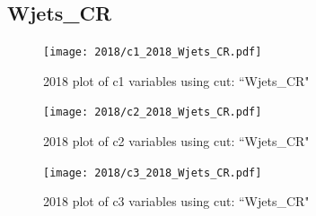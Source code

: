 \documentclass{article}
\begin{document}
      \subsection*{Wjets\_CR}
                        \begin{figure}[H]
                            \centering
                            \caption{2018 plot of c1 variables using cut: ``Wjets\_CR"}
                            \texttt{[image: 2018/c1\_2018\_Wjets\_CR.pdf]}
                        \end{figure}    
                        \begin{figure}[H]
                            \centering
                            \caption{2018 plot of c2 variables using cut: ``Wjets\_CR"}
                            \texttt{[image: 2018/c2\_2018\_Wjets\_CR.pdf]}
                        \end{figure}    
                        \begin{figure}[H]
                            \centering
                            \caption{2018 plot of c3 variables using cut: ``Wjets\_CR"}
                            \texttt{[image: 2018/c3\_2018\_Wjets\_CR.pdf]}
                        \end{figure}    
\end{document}
